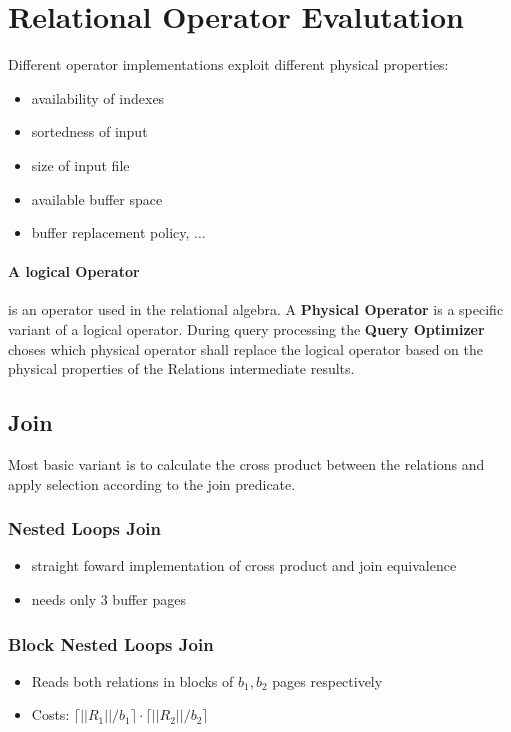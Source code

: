  \section{Relational Operator Evalutation}
 Different operator implementations exploit different physical properties:
 \begin{itemize}
     \item availability of indexes
     \item sortedness of input
     \item size of input file
     \item available buffer space
     \item buffer replacement policy, $\dots$
 \end{itemize}
 
 \paragraph{A logical Operator} is an operator used in the relational algebra. A \textbf{Physical Operator } is a specific variant of a logical operator. During query processing the \textbf{Query Optimizer} choses which physical operator shall replace the logical operator based on the physical properties of the Relations intermediate results.
 

 \subsection{Join}
 Most basic variant is to calculate the cross product between the relations and apply selection according to the join predicate.
 
 \subsubsection{Nested Loops Join}
 \begin{itemize}
     \item straight foward implementation of cross product and join equivalence
     \item needs only 3 buffer pages
 \end{itemize}
 
 \subsubsection{Block Nested Loops Join}
 \begin{itemize}
     \item Reads both relations in blocks of $b_1, b_2$ pages respectively
     \item Costs: $\lceil ||R_1||/b_1 \rceil \cdot \lceil ||R_2||/b_2 \rceil$
 \end{itemize}
 
